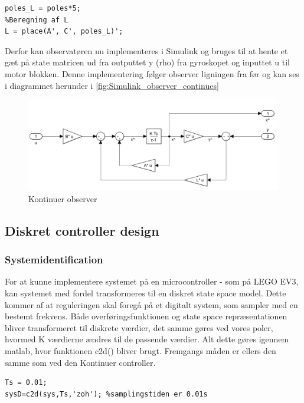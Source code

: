 \begin{lstlisting}[frame=single]
%Valg af poler er polerne ganget med 5
poles_L = poles*5; 
%Beregning af L
L = place(A', C', poles_L)'; 
\end{lstlisting}

Derfor kan observatøren nu implementeres i Simulink og bruges til at hente et gæt på state matricen ud fra outputtet y (rho) fra gyroskopet og inputtet u til motor blokken. Denne implementering følger observer ligningen fra før og kan ses i diagrammet herunder i \autoref{fig:Simulink_observer_continues}

\begin{figure}[H]
	\centering
	\includegraphics[width = 1\textwidth]{figur/Simulink_observer_continues}
	\caption{Kontinuer observer}
	\label{fig:Simulink_observer_continues}
\end{figure}


\subsection{Diskret controller design}
\subsubsection{Systemidentification}
For at kunne implementere systemet på en microcontroller - som på LEGO EV3, kan systemet med fordel transformeres til en diskret state space model. Dette kommer af at reguleringen skal foregå på et digitalt system, som sampler med en bestemt frekvens. Både overføringsfunktionen og state space repræsentationen bliver transformeret til diskrete værdier, det samme gøres ved vores poler, hvormed K værdierne ændres til de passende værdier. Alt dette gøres igennem matlab, hvor funktionen c2d() bliver brugt. Fremgangs måden  er ellers den samme som ved den Kontinuer controller. 

\begin{lstlisting}[frame=single]
Ts = 0.01;
sysD=c2d(sys,Ts,'zoh'); %samplingstiden er 0.01s
\end{lstlisting}

